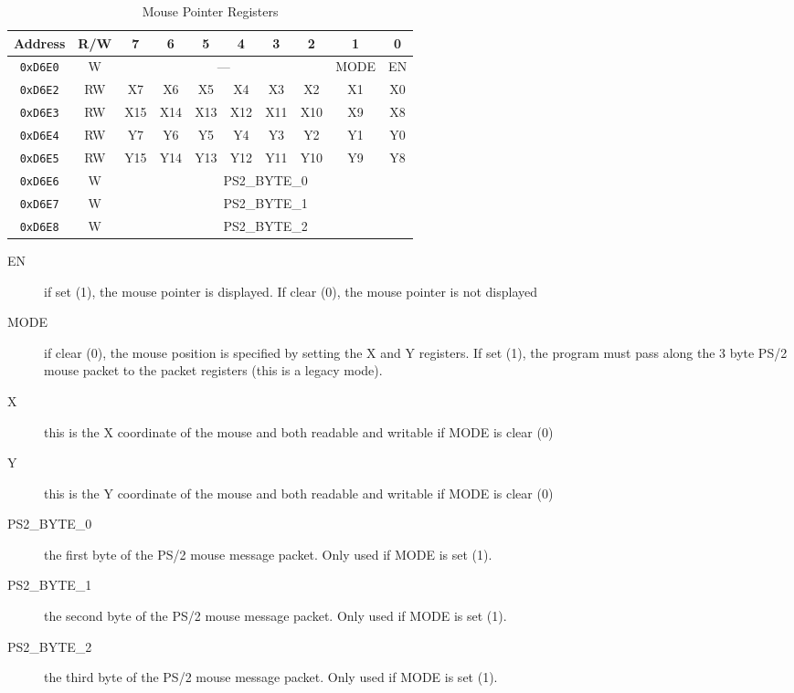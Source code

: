 \begin{table}[h]
    \begin{center}
        \begin{tabular}{|c|c|c|c|c|c|c|c|c|c|} \hline
            Address & R/W & 7 & 6 & 5 & 4 & 3 & 2 & 1 & 0 \\\hline\hline
            \verb+0xD6E0+ & W & \multicolumn{6}{|c|}{---} & MODE & EN \\\hline
            \verb+0xD6E2+ & RW & X7 & X6 & X5 & X4 & X3 & X2 & X1 & X0 \\\hline
            \verb+0xD6E3+ & RW & X15 & X14 & X13 & X12 & X11 & X10 & X9 & X8 \\\hline
            \verb+0xD6E4+ & RW & Y7 & Y6 & Y5 & Y4 & Y3 & Y2 & Y1 & Y0 \\\hline
            \verb+0xD6E5+ & RW & Y15 & Y14 & Y13 & Y12 & Y11 & Y10 & Y9 & Y8 \\\hline
            \verb+0xD6E6+ & W & \multicolumn{8}{|c|}{PS2\_BYTE\_0} \\\hline
            \verb+0xD6E7+ & W & \multicolumn{8}{|c|}{PS2\_BYTE\_1} \\\hline
            \verb+0xD6E8+ & W & \multicolumn{8}{|c|}{PS2\_BYTE\_2} \\\hline
        \end{tabular}
    \end{center}
    \caption{Mouse Pointer Registers}
    \label{tab:mouse_reg}
\end{table}

\begin{description}
    \item[EN] if set (1), the mouse pointer is displayed. If clear (0), the mouse pointer is not displayed
    \item[MODE] if clear (0), the mouse position is specified by setting the X and Y registers. If set (1), the program must pass along the 3 byte PS/2 mouse packet to the packet registers (this is a legacy mode).
    \item[X] this is the X coordinate of the mouse and both readable and writable if MODE is clear (0)
    \item[Y] this is the Y coordinate of the mouse and both readable and writable if MODE is clear (0)
    \item[PS2\_BYTE\_0] the first byte of the PS/2 mouse message packet. Only used if MODE is set (1).
    \item[PS2\_BYTE\_1] the second byte of the PS/2 mouse message packet. Only used if MODE is set (1).
    \item[PS2\_BYTE\_2] the third byte of the PS/2 mouse message packet. Only used if MODE is set (1).
\end{description}